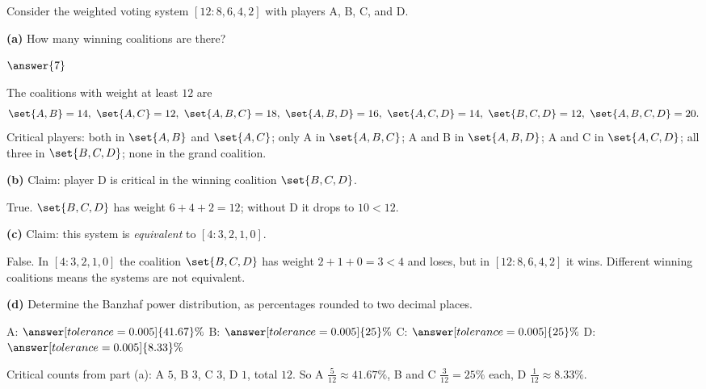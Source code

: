 \documentclass[12pt]{ximera}
\begin{document}
\begin{problem}
Consider the weighted voting system $[12:8,6,4,2]$ with players A, B, C, and D.

\begin{prompt}
\textbf{(a)} How many winning coalitions are there?

$\answer{7}$

\begin{feedback}
The coalitions with weight at least $12$ are
\[
\set{A,B}=14,\ \set{A,C}=12,\ \set{A,B,C}=18,\ \set{A,B,D}=16,\ \set{A,C,D}=14,\
\set{B,C,D}=12,\ \set{A,B,C,D}=20.
\]
Critical players: both in $\set{A,B}$ and $\set{A,C}$; only A in $\set{A,B,C}$; A and B
in $\set{A,B,D}$; A and C in $\set{A,C,D}$; all three in $\set{B,C,D}$; none in the
grand coalition.
\end{feedback}
\end{prompt}

\begin{prompt}
\textbf{(b)} Claim: player D is critical in the winning coalition $\set{B,C,D}$.

\begin{multipleChoice}
\end{multipleChoice}

\begin{feedback}
True. $\set{B,C,D}$ has weight $6+4+2=12$; without D it drops to $10<12$.
\end{feedback}
\end{prompt}

\begin{prompt}
\textbf{(c)} Claim: this system is \emph{equivalent} to $[4:3,2,1,0]$.

\begin{multipleChoice}
\choice[correct]{False}
\end{multipleChoice}

\begin{feedback}
False. In $[4:3,2,1,0]$ the coalition $\set{B,C,D}$ has weight $2+1+0=3<4$ and loses,
but in $[12:8,6,4,2]$ it wins. Different winning coalitions means the systems are not
equivalent.
\end{feedback}
\end{prompt}

\begin{prompt}
\textbf{(d)} Determine the Banzhaf power distribution, as percentages rounded to two
decimal places.

A: $\answer[tolerance=0.005]{41.67}\%$ \quad B: $\answer[tolerance=0.005]{25}\%$ \quad
C: $\answer[tolerance=0.005]{25}\%$ \quad D: $\answer[tolerance=0.005]{8.33}\%$

\begin{feedback}
Critical counts from part (a): A $5$, B $3$, C $3$, D $1$, total $12$. So A
$\frac{5}{12}\approx 41.67\%$, B and C $\frac{3}{12}=25\%$ each, D $\frac1{12}\approx 8.33\%$.
\end{feedback}
\end{prompt}
\end{problem}
\end{document}
